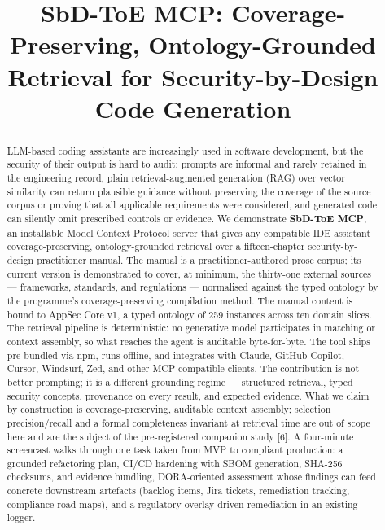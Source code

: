 \documentclass[conference]{IEEEtran}
\begin{document}
\title{SbD-ToE MCP: Coverage-Preserving, Ontology-Grounded Retrieval for
Security-by-Design Code Generation}

\author{%
}

\maketitle

\begin{abstract}
LLM-based coding assistants are increasingly used in software
development, but the security of their output is hard to audit: prompts
are informal and rarely retained in the engineering record, plain
retrieval-augmented generation (RAG) over vector similarity can return
plausible guidance without preserving the coverage of the source corpus
or proving that all applicable requirements were considered, and
generated code can silently omit prescribed controls or evidence. We
demonstrate \textbf{SbD-ToE MCP}, an installable Model Context Protocol
server that gives any compatible IDE assistant coverage-preserving,
ontology-grounded retrieval over a fifteen-chapter security-by-design
practitioner manual. The manual is a practitioner-authored prose corpus;
its current version is demonstrated to cover, at minimum, the thirty-one
external sources --- frameworks, standards, and regulations ---
normalised against the typed ontology by the programme's
coverage-preserving compilation method. The manual content is bound to
AppSec Core v1, a typed ontology of 259 instances across ten domain
slices. The retrieval pipeline is deterministic: no generative model
participates in matching or context assembly, so what reaches the agent
is auditable byte-for-byte. The tool ships pre-bundled via npm, runs
offline, and integrates with Claude, GitHub Copilot, Cursor, Windsurf,
Zed, and other MCP-compatible clients. The contribution is not better
prompting; it is a different grounding regime --- structured retrieval,
typed security concepts, provenance on every result, and expected
evidence. What we claim by construction is coverage-preserving,
auditable context assembly; selection precision/recall and a formal
completeness invariant at retrieval time are out of scope here and are
the subject of the pre-registered companion study {[}6{]}. A four-minute
screencast walks through one task taken from MVP to compliant
production: a grounded refactoring plan, CI/CD hardening with SBOM
generation, SHA-256 checksums, and evidence bundling, DORA-oriented
assessment whose findings can feed concrete downstream artefacts
(backlog items, Jira tickets, remediation tracking, compliance road
maps), and a regulatory-overlay-driven remediation in an existing
logger.
\end{abstract}
\end{document}
